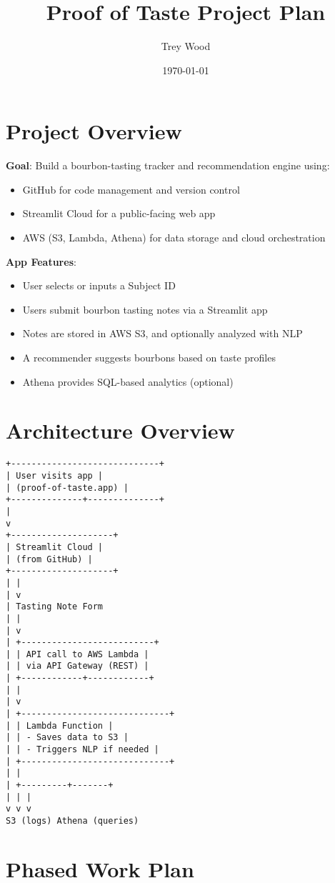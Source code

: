 \documentclass[12pt]{article}
\title{\textbf{Proof of Taste Project Plan}}
\author{Trey Wood}
\date{\today}
\begin{document}
\maketitle

\section*{Project Overview}
\textbf{Goal}: Build a bourbon-tasting tracker and recommendation engine using:
\begin{itemize}[itemsep=0.5em]
\item GitHub for code management and version control
\item Streamlit Cloud for a public-facing web app
\item AWS (S3, Lambda, Athena) for data storage and cloud orchestration
\end{itemize}

\vspace{1em}
\textbf{App Features}:
\begin{itemize}[itemsep=0.5em]
\item User selects or inputs a Subject ID
\item Users submit bourbon tasting notes via a Streamlit app
\item Notes are stored in AWS S3, and optionally analyzed with NLP
\item A recommender suggests bourbons based on taste profiles
\item Athena provides SQL-based analytics (optional)
\end{itemize}

\section*{Architecture Overview}
\begin{verbatim}
+-----------------------------+
| User visits app |
| (proof-of-taste.app) |
+--------------+--------------+
|
v
+--------------------+
| Streamlit Cloud |
| (from GitHub) |
+--------------------+
| |
| v
| Tasting Note Form
| |
| v
| +--------------------------+
| | API call to AWS Lambda |
| | via API Gateway (REST) |
| +------------+------------+
| |
| v
| +-----------------------------+
| | Lambda Function |
| | - Saves data to S3 |
| | - Triggers NLP if needed |
| +-----------------------------+
| |
| +---------+-------+
| | |
v v v
S3 (logs) Athena (queries)
\end{verbatim}

\section*{Phased Work Plan}
\end{document}
